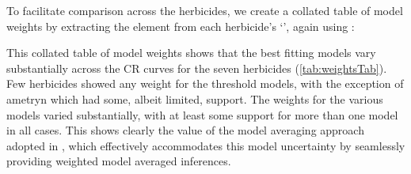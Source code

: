 \documentclass[
  shortnames]{jss}
\newcommand{\cls}[1]{`\code{#1}'}
\begin{document}
\begin{CodeChunk}
\end{CodeChunk}

To facilitate comparison across the herbicides, we create a collated table of model weights by extracting the  element from each herbicide's \cls{bayesmanecfit}, again using :

\begin{CodeChunk}
\end{CodeChunk}

This collated table of model weights shows that the best fitting models vary substantially across the CR curves for the seven herbicides (\autoref{tab:weightsTab}). Few herbicides showed any weight for the  threshold models, with the exception of ametryn which had some, albeit limited, support. The weights for the various  models varied substantially, with at least some support for more than one model in all cases. This shows clearly the value of the model averaging approach adopted in , which effectively accommodates this model uncertainty by seamlessly providing weighted model averaged inferences.
\end{document}
